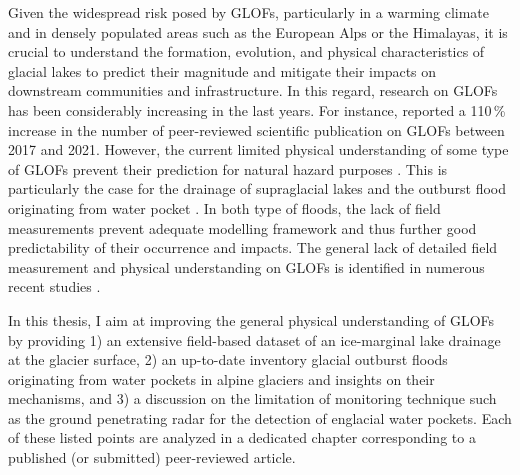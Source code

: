 Given the widespread risk posed by GLOFs, particularly in a warming climate and in densely populated areas such as the European Alps or the Himalayas, it is crucial to understand the formation, evolution, and physical characteristics of glacial lakes to predict their magnitude and mitigate their impacts on downstream communities and infrastructure. In this regard, research on GLOFs has been considerably increasing in the last years. For instance, \cite{Emmer&al2022} reported a 110\,\% increase in the number of peer-reviewed scientific publication on GLOFs between 2017 and 2021. However, the current limited physical understanding of some type of GLOFs prevent their prediction for natural hazard purposes \citep{Emmer&al2022}. This is particularly the case for the drainage of supraglacial lakes \citep[e.g.][]{Vincent&al2010} and the outburst flood originating from water pocket \citep[e.g.][]{Haeberli1983}. In both type of floods, the lack of field measurements prevent adequate modelling framework and thus further good predictability of their occurrence and impacts. The general lack of detailed field measurement and physical understanding on GLOFs is identified in numerous recent studies \citep{Zhang&al2024, Carrivick&Tweed2016, Veh&al2022}.

In this thesis, I aim at improving the general physical understanding of GLOFs by providing 1) an extensive field-based dataset of an ice-marginal lake drainage at the glacier surface, 2) an up-to-date inventory glacial outburst floods originating from water pockets in alpine glaciers and insights on their mechanisms, and 3) a discussion on the limitation of monitoring technique such as the ground penetrating radar for the detection of englacial water pockets. Each of these listed points are analyzed in a dedicated chapter corresponding to a published (or submitted) peer-reviewed article.

